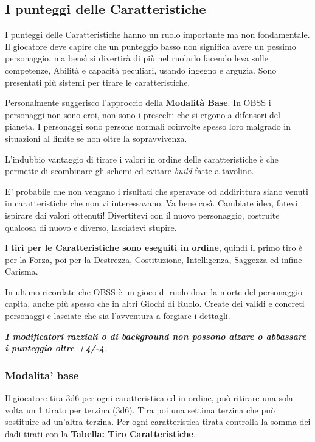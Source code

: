 \begin{multicols}{2}
\subsection{I punteggi delle Caratteristiche} \hypertarget{assegnazione.punteggi.caratteristica}{}\label{assegnazionepunteggicaratteristica}

I punteggi delle Caratteristiche hanno un ruolo importante ma non fondamentale. Il giocatore deve capire che un punteggio basso non significa avere un pessimo personaggio, ma bensì si divertirà di più nel ruolarlo facendo leva sulle competenze, Abilità e capacità peculiari, usando ingegno e arguzia. Sono presentati più sistemi per tirare le caratteristiche.

Personalmente suggerisco l'approccio della \textbf{Modalità Base}. In OBSS i personaggi non sono eroi, non sono i prescelti che si ergono a difensori del pianeta. I personaggi sono persone normali coinvolte spesso loro malgrado in situazioni al limite se non oltre la sopravvivenza.

L'indubbio vantaggio di tirare i valori in ordine delle caratteristiche è che permette di scombinare gli schemi ed evitare \emph{build} fatte a tavolino.

E' probabile che non vengano i risultati che speravate od addirittura siano venuti in caratteristiche che non vi interessavano. Va bene così. Cambiate idea, fatevi ispirare dai valori ottenuti! Divertitevi con il nuovo personaggio, costruite qualcosa di nuovo e diverso, lasciatevi stupire.

I \textbf{tiri per le Caratteristiche sono eseguiti in ordine}, quindi il primo tiro è per la Forza, poi per la Destrezza, Costituzione, Intelligenza, Saggezza ed infine Carisma.

In ultimo ricordate che OBSS è un gioco di ruolo dove la morte del personaggio capita, anche più spesso che in altri Giochi di Ruolo. Create dei validi e concreti personaggi e lasciate che sia l'avventura a forgiare i dettagli.

\textbf{\emph{I modificatori razziali o di background non possono alzare o abbassare i punteggio oltre +4/-4}}.

\subsubsection{Modalita' base}\label{modalitabase}

Il giocatore tira 3d6 per ogni caratteristica ed in ordine, può ritirare una sola volta un 1 tirato per terzina (3d6). Tira poi una settima terzina che può sostituire ad un'altra terzina. Per ogni caratteristica tirata controlla la somma dei dadi tirati con la \textbf{Tabella: Tiro Caratteristiche}. 


\end{multicols}
